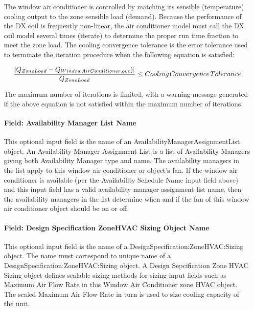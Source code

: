 The window air conditioner is controlled by matching its sensible (temperature) cooling output to the zone sensible load (demand). Because the performance of the DX coil is frequently non-linear, the air conditioner model must call the DX coil model several times (iterate) to determine the proper run time fraction to meet the zone load. The cooling convergence tolerance is the error tolerance used to terminate the iteration procedure when the following equation is satisfied:

\begin{equation}
\frac{{\left| {{Q_{ZoneLoad}} - {Q_{WindowAirConditioner,out}})} \right|}}{{{Q_{ZoneLoad}}}} \le Cooling{\kern 1pt} Convergence{\kern 1pt} Tolerance
\end{equation}

The maximum number of iterations is limited, with a warning message generated if the above equation is not satisfied within the maximum number of iterations.

\paragraph{Field: Availability Manager List Name}\label{field-availability-manager-list-name-5}

This optional input field is the name of an AvailabilityManagerAssignmentList object. An Availability Manager Assignment List is a list of Availability Managers giving both Availability Manager type and name. The availability managers in the list apply to this window air conditioner or object's fan. If the window air conditioner is available (per the Availability Schedule Name input field above) and this input field has a valid availability manager assignment list name, then the availability managers in the list determine when and if the fan of this window air conditioner object should be on or off.

\paragraph{Field: Design Specification ZoneHVAC Sizing Object Name}\label{field-design-specification-zonehvac-sizing-object-name-5}

This optional input field is the name of a DesignSpecification:ZoneHVAC:Sizing object. The name must correspond to unique name of a DesignSpecification:ZoneHVAC:Sizing object. A Design Sepcification Zone HVAC Sizing object defines scalable sizing methods for sizing input fields such as Maximum Air Flow Rate in this Window Air Conditioner zone HVAC object. The scaled Maximum Air Flow Rate in turn is used to size cooling capacity of the unit.

